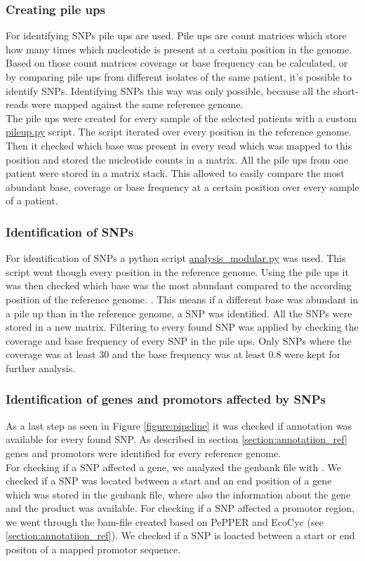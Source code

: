 \subsubsection{Creating pile ups}
For identifying SNPs pile ups are used. Pile ups are count matrices which store how many times which nucleotide is present at a certain position in the genome. Based on those count matrices coverage or base frequency can be calculated, or by comparing pile ups from different isolates of the same patient, it's possible to identify SNPs. Identifying SNPs this way was only possible, because all the short-reads were mapped against the same reference genome.\\
The pile ups were created for every sample of the selected patients with a custom \href{https://github.com/nahanoo/ESBL\_project/pileup.py}{pileup.py} script. The script iterated over every position in the reference genome. Then it checked which base was present in every read which was mapped to this position and stored the nucleotide counts in a matrix. All the pile ups from one patient were stored in a matrix stack. This allowed to easily compare the most abundant base, coverage or base frequency at a certain position over every sample of a patient.

\subsubsection{Identification of SNPs} 
For identification of SNPs a python script \href{https://github.com/nahanoo/ESBL\_project/pileup.py}{analysis\_modular.py} was used. This script went though every position in the reference genome. Using the pile ups it was then checked which base was the most abundant compared to the according position of the reference genome. . This means if a different base was abundant in a pile up than in the reference genome, a SNP was identified. All the SNPs were stored in a new matrix. Filtering to every found SNP was applied by checking the coverage and base frequency of every SNP in the pile ups. Only SNPs where the coverage was at least 30 and the base frequency was at least 0.8 were kept for further analysis. 

\subsubsection{Identification of genes and promotors affected by SNPs}
As a last step as seen in Figure \ref{figure:pipeline} it was checked if annotation was available for every found SNP. As described in section \ref{section:annotatiion_ref} genes and promotors were identified for every reference genome. \\
For checking if a SNP affected a gene, we analyzed the genbank file with \cite{cock_biopython:_2009}. We checked if a SNP was located between a start and an end position of a gene which was stored in  the genbank file, where also the information about the gene and the product was available. For checking if a SNP affected a promotor region, we went through the bam-file created based on PePPER and EcoCyc (see \ref{section:annotatiion_ref}). We checked if a SNP is loacted between a start or end positon of a mapped promotor sequence. 


